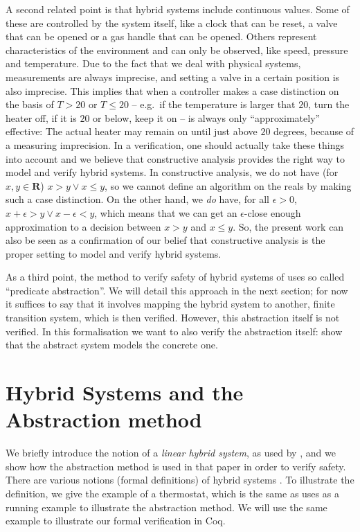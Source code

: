 \documentclass[runningheads]{llncs}
\newcommand{\IR}{{\mathbf R}}
\begin{document}
A second related point is that hybrid systems include continuous
values. Some of these are controlled by the system itself, like a
clock that can be reset, a valve that can be opened or a gas handle
that can be opened. Others represent characteristics of the
environment and can only be observed, like speed, pressure and
temperature. Due to the fact that we deal with physical systems,
measurements are always imprecise, and setting a valve in a certain
position %
is also imprecise. 
This implies that when a controller makes a case distinction on the
basis of $T>20$ or $T\leq 20$ -- e.g.\ if the temperature is larger
that $20$, turn the heater off, if it is $20$ or below, keep it on --
is always only ``approximately'' effective: The actual heater may
remain on until just above $20$ degrees, because of a measuring
imprecision. In a verification, one should actually take these things
into account and we believe that constructive analysis provides the
right way to model and verify hybrid systems. In constructive
analysis, we do not have (for $x,y\in\IR$) $x>y \vee x\leq y$, so we
cannot define an algorithm on the reals by making such a case
distinction. On the other hand, we {\em do\/} have, for all
$\epsilon>0$, $x+\epsilon>y \vee x-\epsilon< y$, which means that we
can get an $\epsilon$-close enough approximation to a decision between
$x>y$ and $x\leq y$.  So, the present work can also be seen as a
confirmation of our belief that constructive analysis is the
proper setting to model and verify hybrid systems.

As a third point, the method to verify safety of hybrid systems of
\cite{alur} uses so called ``predicate abstraction''. We will detail
this approach in the next section; for now it suffices to say that it
involves mapping the hybrid system to another, finite transition
system, which is then verified. However, this abstraction itself is
not verified. In this formalisation we want to also verify the
abstraction itself: show that the abstract system models the concrete
one.


\section{Hybrid Systems and the Abstraction method}
\label{sec:hybsys}
We briefly introduce the notion of a {\em linear hybrid system}, as
used by \cite{alur}, and we show how the abstraction method is used in
that paper in order to verify safety. There are various notions
(formal definitions) of hybrid systems
\cite{henziger,lynchvaandrager}. To illustrate the definition, we give
the example of a thermostat, which is the same as \cite{alur} uses as
a running example to illustrate the abstraction method. We will use
the same example to illustrate our formal verification in Coq.
\end{document}
